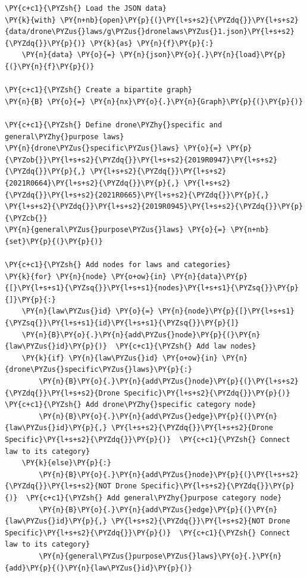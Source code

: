     \begin{tcolorbox}[breakable, size=fbox, boxrule=1pt, pad at break*=1mm,colback=cellbackground, colframe=cellborder]
\begin{Verbatim}[commandchars=\\\{\}]
\PY{c+c1}{\PYZsh{} Load the JSON data}
\PY{k}{with} \PY{n+nb}{open}\PY{p}{(}\PY{l+s+s2}{\PYZdq{}}\PY{l+s+s2}{data/drone\PYZus{}laws/g\PYZus{}dronelaws\PYZus{}1.json}\PY{l+s+s2}{\PYZdq{}}\PY{p}{)} \PY{k}{as} \PY{n}{f}\PY{p}{:}
    \PY{n}{data} \PY{o}{=} \PY{n}{json}\PY{o}{.}\PY{n}{load}\PY{p}{(}\PY{n}{f}\PY{p}{)}

\PY{c+c1}{\PYZsh{} Create a bipartite graph}
\PY{n}{B} \PY{o}{=} \PY{n}{nx}\PY{o}{.}\PY{n}{Graph}\PY{p}{(}\PY{p}{)}

\PY{c+c1}{\PYZsh{} Define drone\PYZhy{}specific and general\PYZhy{}purpose laws}
\PY{n}{drone\PYZus{}specific\PYZus{}laws} \PY{o}{=} \PY{p}{\PYZob{}}\PY{l+s+s2}{\PYZdq{}}\PY{l+s+s2}{2019R0947}\PY{l+s+s2}{\PYZdq{}}\PY{p}{,} \PY{l+s+s2}{\PYZdq{}}\PY{l+s+s2}{2021R0664}\PY{l+s+s2}{\PYZdq{}}\PY{p}{,} \PY{l+s+s2}{\PYZdq{}}\PY{l+s+s2}{2021R0665}\PY{l+s+s2}{\PYZdq{}}\PY{p}{,} \PY{l+s+s2}{\PYZdq{}}\PY{l+s+s2}{2019R0945}\PY{l+s+s2}{\PYZdq{}}\PY{p}{\PYZcb{}}
\PY{n}{general\PYZus{}purpose\PYZus{}laws} \PY{o}{=} \PY{n+nb}{set}\PY{p}{(}\PY{p}{)}

\PY{c+c1}{\PYZsh{} Add nodes for laws and categories}
\PY{k}{for} \PY{n}{node} \PY{o+ow}{in} \PY{n}{data}\PY{p}{[}\PY{l+s+s1}{\PYZsq{}}\PY{l+s+s1}{nodes}\PY{l+s+s1}{\PYZsq{}}\PY{p}{]}\PY{p}{:}
    \PY{n}{law\PYZus{}id} \PY{o}{=} \PY{n}{node}\PY{p}{[}\PY{l+s+s1}{\PYZsq{}}\PY{l+s+s1}{id}\PY{l+s+s1}{\PYZsq{}}\PY{p}{]}
    \PY{n}{B}\PY{o}{.}\PY{n}{add\PYZus{}node}\PY{p}{(}\PY{n}{law\PYZus{}id}\PY{p}{)}  \PY{c+c1}{\PYZsh{} Add law nodes}
    \PY{k}{if} \PY{n}{law\PYZus{}id} \PY{o+ow}{in} \PY{n}{drone\PYZus{}specific\PYZus{}laws}\PY{p}{:}
        \PY{n}{B}\PY{o}{.}\PY{n}{add\PYZus{}node}\PY{p}{(}\PY{l+s+s2}{\PYZdq{}}\PY{l+s+s2}{Drone Specific}\PY{l+s+s2}{\PYZdq{}}\PY{p}{)}  \PY{c+c1}{\PYZsh{} Add drone\PYZhy{}specific category node}
        \PY{n}{B}\PY{o}{.}\PY{n}{add\PYZus{}edge}\PY{p}{(}\PY{n}{law\PYZus{}id}\PY{p}{,} \PY{l+s+s2}{\PYZdq{}}\PY{l+s+s2}{Drone Specific}\PY{l+s+s2}{\PYZdq{}}\PY{p}{)}  \PY{c+c1}{\PYZsh{} Connect law to its category}
    \PY{k}{else}\PY{p}{:}
        \PY{n}{B}\PY{o}{.}\PY{n}{add\PYZus{}node}\PY{p}{(}\PY{l+s+s2}{\PYZdq{}}\PY{l+s+s2}{NOT Drone Specific}\PY{l+s+s2}{\PYZdq{}}\PY{p}{)}  \PY{c+c1}{\PYZsh{} Add general\PYZhy{}purpose category node}
        \PY{n}{B}\PY{o}{.}\PY{n}{add\PYZus{}edge}\PY{p}{(}\PY{n}{law\PYZus{}id}\PY{p}{,} \PY{l+s+s2}{\PYZdq{}}\PY{l+s+s2}{NOT Drone Specific}\PY{l+s+s2}{\PYZdq{}}\PY{p}{)}  \PY{c+c1}{\PYZsh{} Connect law to its category}
        \PY{n}{general\PYZus{}purpose\PYZus{}laws}\PY{o}{.}\PY{n}{add}\PY{p}{(}\PY{n}{law\PYZus{}id}\PY{p}{)}


\end{Verbatim}
\end{tcolorbox}

